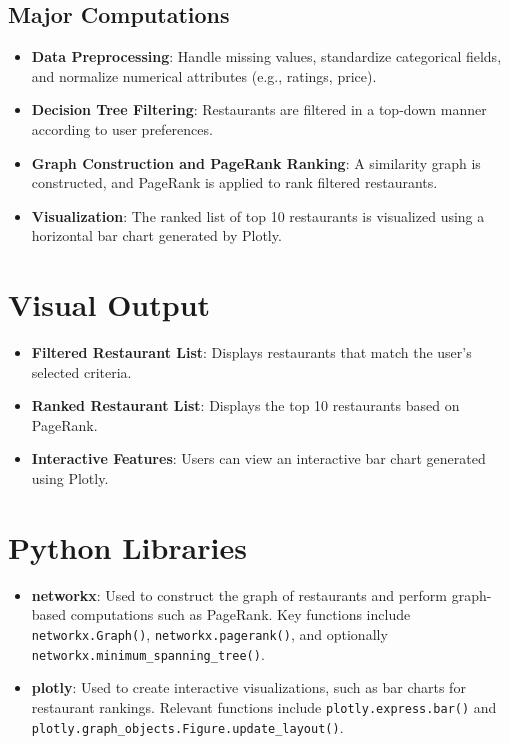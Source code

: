 \documentclass[fontsize=11pt]{article}
\begin{document}
\subsection*{Major Computations}
\begin{itemize}
    \item \textbf{Data Preprocessing}: Handle missing values, standardize categorical fields, and normalize numerical attributes (e.g., ratings, price). 
    \item \textbf{Decision Tree Filtering}: Restaurants are filtered in a top-down manner according to user preferences.
    \item \textbf{Graph Construction and PageRank Ranking}: A similarity graph is constructed, and PageRank is applied to rank filtered restaurants.
    \item \textbf{Visualization}: The ranked list of top 10 restaurants is visualized using a horizontal bar chart generated by Plotly.
\end{itemize}

\section*{Visual Output}
\begin{itemize}
    \item \textbf{Filtered Restaurant List}: Displays restaurants that match the user's selected criteria.
    \item \textbf{Ranked Restaurant List}: Displays the top 10 restaurants based on PageRank.
    \item \textbf{Interactive Features}: Users can view an interactive bar chart generated using Plotly.
\end{itemize}

\section*{Python Libraries}
\begin{itemize}
    \item \textbf{networkx}: Used to construct the graph of restaurants and perform graph-based computations such as PageRank. Key functions include \verb|networkx.Graph()|, \verb|networkx.pagerank()|, and optionally \\\verb|networkx.minimum_spanning_tree()|.
    \item \textbf{plotly}: Used to create interactive visualizations, such as bar charts for restaurant rankings. Relevant functions include \verb|plotly.express.bar()| and \verb|plotly.graph_objects.Figure.update_layout()|.
\end{itemize}
\end{document}
